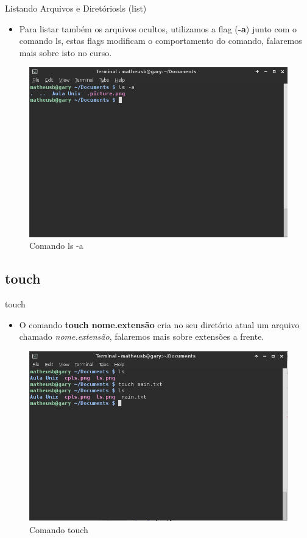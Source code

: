 \documentclass{beamer}
\begin{document}
 \begin{frame}{Listando Arquivos e Diretórios}{ls (list)}
  \begin{itemize}
  \item {
   Para listar também os arquivos ocultos, utilizamos a flag (\textbf{-a}) junto com o comando ls, estas flags modificam o comportamento do comando, falaremos mais sobre isto no curso.
  }
 \end{itemize}
  \begin{figure}[h!]
        \centering
        \includegraphics[scale=0.30]{ls-a.png}
        \caption{Comando ls -a}
        \label{fig:Comando ls}
    \end{figure}
\end{frame}

\subsection{touch}

\begin{frame}{touch}
  \begin{itemize}
  \item {
   O comando \textbf{touch nome.extensão} cria no seu diretório atual um arquivo chamado \textit{nome.extensão}, falaremos mais sobre extensões a frente.
  }
 \end{itemize}
   \begin{figure}[h!]
        \centering
        \includegraphics[scale=0.30]{touch.png}
        \caption{Comando touch}
        \label{fig:Comando touch}
    \end{figure}
\end{frame}
\end{document}

